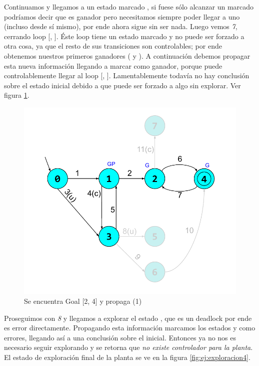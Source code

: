 Continuamos y llegamos a un estado marcado , si fuese sólo alcanzar un marcado podríamos decir que es ganador pero necesitamos siempre poder llegar a uno (incluso desde sí mismo), por ende ahora sigue sin ser nada. Luego vemos \textit{7}, cerrando loop [, ]. Éste loop tiene un estado marcado y  no puede ser forzado a otra cosa, ya que el resto de sus transiciones son controlables; por ende obtenemos nuestros primeros ganadores ( y ). A continuación debemos propagar esta nueva información llegando a marcar  como ganador, porque puede controlablemente llegar al loop [, ]. Lamentablemente todavía no hay conclusión sobre el estado inicial debido a que puede ser forzado a algo sin explorar. Ver figura \ref{fig:ej:exploracion3}.

\begin{figure}[h]
 \centering
 \includegraphics[scale=0.6]{figures/ejemplo_on-the-fly/3.pdf}
 \caption{Se encuentra Goal [2, 4] y propaga (1)}
 \label{fig:ej:exploracion3}
\end{figure}

Proseguimos con \textit{8} y llegamos a explorar el estado , que es un deadlock por ende es error directamente. Propagando esta información marcamos los estados  y  como errores, llegando así a una conclusión sobre el inicial. Entonces ya no nos es necesario seguir explorando y se retorna que \textit{no existe controlador para la planta}. El estado de exploración final de la planta se ve en la figura \ref{fig:ej:exploracion4}.

